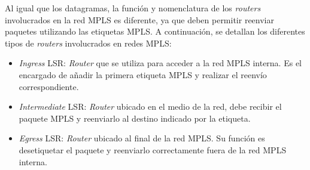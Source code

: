 		Al igual que los datagramas, la función y nomenclatura de los \textit{routers} involucrados en la red MPLS es diferente, ya que deben permitir reenviar paquetes utilizando las etiquetas MPLS. A continuación, se detallan los diferentes tipos de \textit{routers} involucrados en redes MPLS:
		\begin{itemize}
		    \item \textit{Ingress} LSR: \textit{Router} que se utiliza para acceder a la red MPLS interna. Es el encargado de añadir la primera etiqueta MPLS y realizar el reenvío correspondiente.
		    \item \textit{Intermediate} LSR: \textit{Router} ubicado en el medio de la red, debe recibir el paquete MPLS y reenviarlo al destino indicado por la etiqueta.
		    \item \textit{Egress} LSR: \textit{Router} ubicado al final de la red MPLS. Su función es desetiquetar el paquete y reenviarlo correctamente fuera de la red MPLS interna.
		\end{itemize}
		
